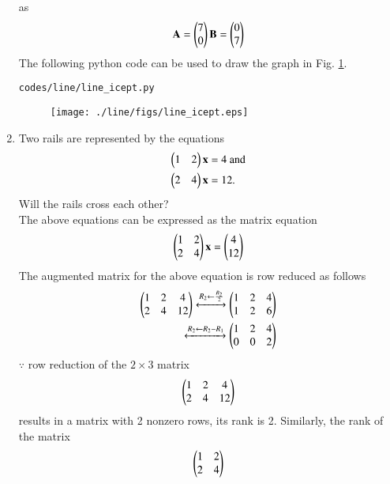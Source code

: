 \begin{enumerate}[label=\arabic*.,ref=\thesubsection.\theenumi]
as
%
\begin{align}
\mathbf{A} = \begin{pmatrix}7\\0\end{pmatrix}
\mathbf{B} = \begin{pmatrix}0\\7\end{pmatrix}
\end{align}
%
The following python code can be used to draw the graph in Fig. \ref{fig:line_icept}.
%
\begin{lstlisting}
codes/line/line_icept.py
\end{lstlisting}
%
\begin{figure}[!ht]
\texttt{[image: ./line/figs/line\_icept.eps]}
\caption{}
\label{fig:line_icept}
\end{figure}
%
%
\item Two rails are represented by the equations 
\label{prob:line_mat_eq}
\begin{align}
\label{eq:line_mat_eq}
\begin{split}
\begin{pmatrix}1 & 2\end{pmatrix}\mathbf{x}  &= 4 \text{ and}
\\
\begin{pmatrix} 2 & 4\end{pmatrix}\mathbf{x} &=  12 . 
\end{split}
\end{align}
%
Will the rails cross each other?
%
\\
\solution The above equations can be expressed as the matrix equation
\begin{align}
\begin{pmatrix}1 & 2\\2 & 4\end{pmatrix} \mathbf{x} = \begin{pmatrix}4\\12\end{pmatrix}
\end{align}
%
The augmented matrix for the above equation is row reduced as follows
\begin{align}
\begin{pmatrix}1 & 2 & 4\\2 & 4 & 12\end{pmatrix} 
\xleftrightarrow {R_2\leftarrow \frac{R_2}{2}}\begin{pmatrix}1 & 2 & 4\\1 & 2 & 6\end{pmatrix} 
\\
\xleftrightarrow {R_2\leftarrow R_2 - R_1}\begin{pmatrix}1 & 2 & 4\\0 & 0 & 2\end{pmatrix} 
\label{eq:line_aug}
\end{align}
%
$\because$ row reduction of the $2\times 3$ matrix
%
\begin{align}
\begin{pmatrix}1 & 2 & 4\\2 & 4 & 12\end{pmatrix} 
\end{align}
%
results in a matrix with 2 nonzero rows, its rank is 2.  Similarly, the rank of the matrix 
%
\begin{align}
\begin{pmatrix}1 & 2\\2 & 4\end{pmatrix} 
\end{align}

\end{enumerate}
